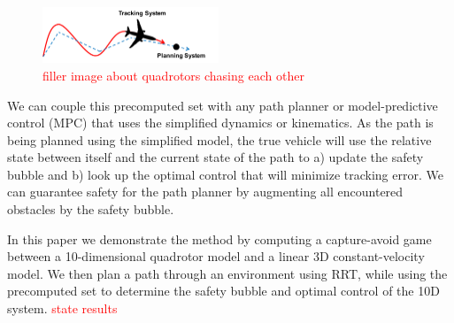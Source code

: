 \begin{figure}
	\centering
	\includegraphics[width=0.47\textwidth]{fig/chasing}
	\caption{\textcolor{red}{filler image about quadrotors chasing each other}}
	\label{fig:chasing}
\end{figure}

We can couple this precomputed set with any path planner or model-predictive control (MPC) that uses the simplified dynamics or kinematics. As the path is being planned using the simplified model, the true vehicle will use the relative state between itself and the current state of the path to a) update the safety bubble and b) look up the optimal control that will minimize tracking error. We can guarantee safety for the path planner by augmenting all encountered obstacles by the safety bubble.

In this paper we demonstrate the method by computing a capture-avoid game between a 10-dimensional quadrotor model and a linear 3D constant-velocity model. We then plan a path through an environment using RRT, while using the precomputed set to determine the safety bubble and optimal control of the 10D system. \textcolor{red}{state results}